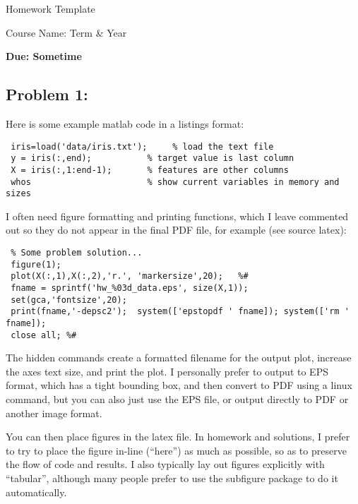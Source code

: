 \documentclass[twoside,11pt]{article}
\newcommand{\figdir}{fig}
\theoremstyle{definition}
\begin{document}
\centerline{\Large Homework Template}
\centerline{Course Name: Term \& Year}
\centerline{\bf Due: Sometime}


\subsection*{Problem 1: }
Here is some example matlab code in a listings format:
\begin{lstlisting}
 iris=load('data/iris.txt');     % load the text file
 y = iris(:,end);           % target value is last column
 X = iris(:,1:end-1);       % features are other columns
 whos                       % show current variables in memory and sizes 
\end{lstlisting}

I often need figure formatting and printing functions, which I leave commented out
so they do not appear in the final PDF file, for example (see source latex):
\begin{lstlisting}
 % Some problem solution...
 figure(1);
 plot(X(:,1),X(:,2),'r.', 'markersize',20);   %#
 fname = sprintf('hw_%03d_data.eps', size(X,1));
 set(gca,'fontsize',20);
 print(fname,'-depsc2');  system(['epstopdf ' fname]); system(['rm ' fname]); 
 close all; %#
\end{lstlisting}
The hidden commands create a formatted filename for the output plot, increase the
axes text size, and print the plot.  I personally prefer to output to EPS format,
which has a tight bounding box, and then convert to PDF using a linux command,
but you can also just use the EPS file, or output directly to PDF or another image format.

You can then place figures in the latex file.  In homework and solutions, I prefer to try
to place the figure in-line (``here'') as much as possible, so as to preserve the flow of
code and results.  I also typically lay out figures explicitly with ``tabular'', although
many people prefer to use the subfigure package to do it automatically.
\end{document}
